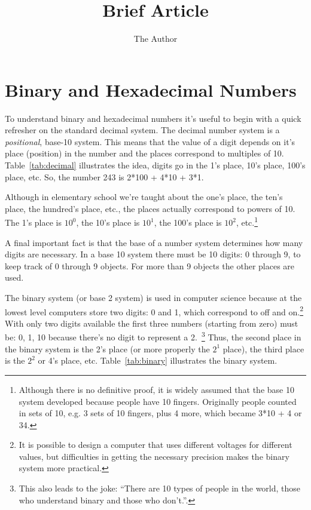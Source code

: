 \documentclass[11pt]{article} %
\title{Brief Article}
\author{The Author}
\begin{document}
\section{Binary and Hexadecimal Numbers}

To understand binary and hexadecimal numbers it's useful to begin with a quick refresher on the standard decimal system.  The decimal number system is a \emph{positional}, base-10  system.  This means that the value of a digit depends on it's place (position) in the number and the places correspond to multiples of 10.  Table~\ref{tab:decimal} illustrates the idea, digits go in the 1's place, 10's place, 100's place, etc. So, the number 243 is 2*100 + 4*10 + 3*1.  

Although in elementary school we're taught about the one's place, the ten's place, the hundred's place, etc., the places actually correspond to powers of 10.  The 1's place is $10^{0}$, the 10's place is $10^{1}$, the 100's place is $10^{2}$, etc.\footnote{Although there is no definitive proof, it is widely assumed that the base 10 system developed because people have 10 fingers.  Originally people counted in sets of 10, e.g. 3 sets of 10 fingers, plus 4 more, which became 3*10 + 4 or 34.}

A final important fact is that the base of a number system determines how many digits are necessary.  In a base 10 system there must be 10 digits: 0 through 9, to keep track of 0 through 9 objects.  For more than 9 objects the other places are used.

The binary system (or base 2 system) is used in computer science because at the lowest level computers store two digits: 0 and 1, which  correspond to off and on.\footnote{It is possible to design a computer that uses different voltages for different values, but difficulties in getting the necessary precision makes the binary system more practical.}  With only two digits available the first three numbers (starting from zero) must be: 0, 1, 10 because there's no digit to represent a 2.~\footnote{This also leads to the joke: ``There are 10 types of people in the world, those who understand binary and those who don't.''.}  Thus, the second place in the binary system is the 2's place (or more properly the $2^{1}$ place), the third place is the $2^{2}$ or 4's place, etc.  Table~\ref{tab:binary} illustrates the binary system.
\end{document}
